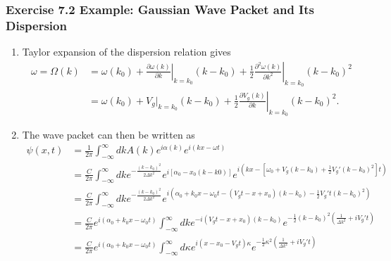 \documentclass[10pt,a4paper]{book}
\theoremstyle{definition}
\begin{document}
\subsubsection{Exercise 7.2 Example: Gaussian Wave Packet and Its Dispersion}
\begin{enumerate}[label=(\alph*)]
\item Taylor expansion of the dispersion relation gives
\begin{align}
    \omega=\Omega(k)&=\omega(k_0)+\left.\frac{\partial \omega(k)}{\partial k}\right|_{k=k_0}(k-k_0)+\frac{1}{2}\left.\frac{\partial^2\omega(k)}{\partial k^2}\right|_{k=k_0}(k-k_0)^2\\
    &=\omega(k_0)+V_g|_{k=k_0}(k-k_0)+\frac{1}{2}\left.\frac{\partial V_g(k)}{\partial k}\right|_{k=k_0}(k-k_0)^2.
\end{align}
\item The wave packet can then be written as
\begin{align}
   \psi(x,t)
   &=\frac{1}{2\pi}\int_{-\infty}^\infty dk A(k)e^{i\alpha(k)}e^{i(kx-\omega t)}\\
   &=\frac{C}{2\pi}\int_{-\infty}^\infty dk e^{-\frac{(k-k_0)^2}{2\Delta k^2}}e^{i[\alpha_0-x_0(k-k0)]}e^{i(kx-[\omega_0+V_g(k-k_0)+\frac{1}{2}V_g'(k-k_0)^2] t)}\\
   &=\frac{C}{2\pi}\int_{-\infty}^\infty dk e^{-\frac{(k-k_0)^2}{2\Delta k^2}}e^{i(\alpha_0+k_0x-\omega_0t-(V_gt-x+x_0)(k-k_0)-\frac{1}{2}V_g't (k-k_0)^2)}\\
   &=\frac{C}{2\pi}e^{i(\alpha_0+k_0x-\omega_0t)}\int_{-\infty}^\infty dk e^{-i(V_gt-x+x_0)(k-k_0)} e^{-\frac{1}{2}(k-k_0)^2\left(\frac{1}{\Delta k^2}+iV_g't\right)}\\
   &=\frac{C}{2\pi}e^{i(\alpha_0+k_0x-\omega_0t)}\int_{-\infty}^\infty d\kappa e^{i(x-x_0-V_gt)\kappa} e^{-\frac{1}{2}\kappa^2\left(\frac{1}{\Delta k^2}+iV_g't\right)}\\
\end{align}


\end{enumerate}
\end{document}
